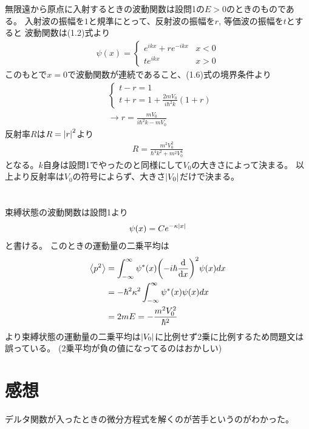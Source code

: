 \documentclass[../../master.tex]{subfiles}
\begin{document}
\section{}
無限遠から原点に入射するときの波動関数は設問1の\(E>0\)のときのものである。
入射波の振幅を\(1\)と規準にとって、反射波の振幅を\(r\), 等価波の振幅を\(t\)とすると
波動関数は(1.2)式より
\begin{align}
    \psi(x) = \begin{cases}
        e^{ikx} + r e^{-ikx} & x<0\\
        t e^{ikx} & x>0
    \end{cases}
\end{align}
このもとで\(x=0\)で波動関数が連続であること、(1.6)式の境界条件より
\begin{align}
    &\begin{cases}
        t-r = 1\\
        t+r = 1 +\frac{2mV_0}{i\hbar^2 k}(1+r)
    \end{cases}\\
    &\rightarrow r = \frac{mV_0}{i\hbar^2 k-mV_0}
\end{align}
反射率\(R\)は\(R=\abs{r}^2\)より
\begin{align}
    R = \frac{m^2 V_0^2}{\hbar^4k^2 + m^2 V_0^4}
\end{align}
となる。\(k\)自身は設問1でやったのと同様にして\(V_0\)の大きさによって決まる。
以上より反射率は\(V_0\)の符号によらず、大きさ\(\abs{V_0}\)だけで決まる。

\section{}
束縛状態の波動関数は設問1より
\begin{align}
    \psi(x) = Ce^{-\kappa\abs{x}}
\end{align}
と書ける。
このときの運動量の二乗平均は
\begin{align}
    \ev{p^2}
        &= \int_{-\infty}^{\infty} \psi^*(x)\qty(-i\hbar\dv{x})^2\psi(x)dx\\
        &= -\hbar^2\kappa^2\int_{-\infty}^{\infty} \psi^*(x)\psi(x)dx\\
        &= 2mE = -\frac{m^2V_0^2}{\hbar^2}
\end{align}
より束縛状態の運動量の二乗平均は\(\abs{V_0}\)に比例せず2乗に比例するため問題文は誤っている。
(2乗平均が負の値になってるのはおかしい)

\section*{感想}
デルタ関数が入ったときの微分方程式を解くのが苦手というのがわかった。
\end{document}
